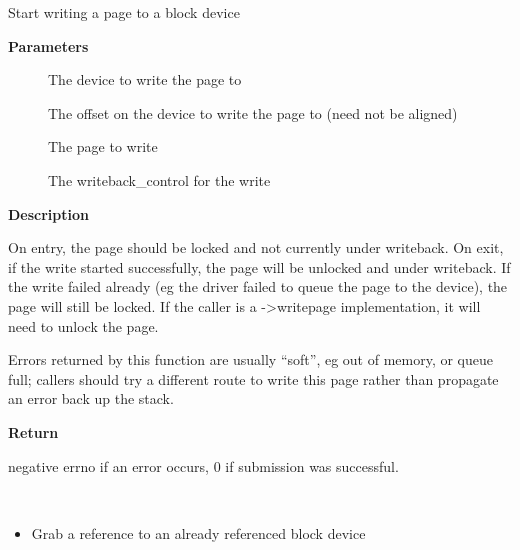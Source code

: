 \documentclass[a4paper,8pt,english]{sphinxmanual}
\begin{document}
\begin{fulllineitems}
\label{filesystems/index:c.bdev_write_page}
Start writing a page to a block device

\end{fulllineitems}


\textbf{Parameters}
\begin{description}
\item[{}] \leavevmode
The device to write the page to

\item[{}] \leavevmode
The offset on the device to write the page to (need not be aligned)

\item[{}] \leavevmode
The page to write

\item[{}] \leavevmode
The writeback\_control for the write

\end{description}

\textbf{Description}

On entry, the page should be locked and not currently under writeback.
On exit, if the write started successfully, the page will be unlocked and
under writeback.  If the write failed already (eg the driver failed to
queue the page to the device), the page will still be locked.  If the
caller is a -\textgreater{}writepage implementation, it will need to unlock the page.

Errors returned by this function are usually ``soft'', eg out of memory, or
queue full; callers should try a different route to write this page rather
than propagate an error back up the stack.

\textbf{Return}

negative errno if an error occurs, 0 if submission was successful.

\begin{fulllineitems}
\label{filesystems/index:c.bdgrab}~\begin{itemize}
\item {} 
Grab a reference to an already referenced block device

\end{itemize}

\end{fulllineitems}
\end{document}
